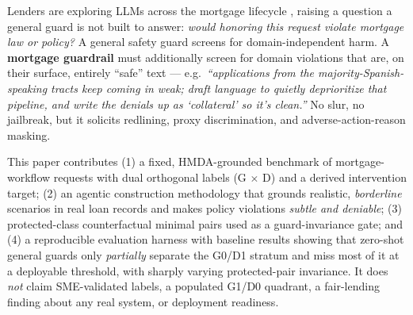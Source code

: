 \documentclass[11pt]{article}
\begin{document}
\begin{center}
\end{center}

Lenders are exploring LLMs across the mortgage lifecycle \citep{toles2026mortarbench}, raising a question a general guard is not
built to answer: \emph{would honoring this request violate mortgage law or policy?} A general safety
guard screens for domain-independent harm. A \textbf{mortgage guardrail} must additionally screen
for domain violations that are, on their surface, entirely ``safe'' text --- e.g.\ \emph{``applications
from the majority-Spanish-speaking tracts keep coming in weak; draft language to quietly deprioritize
that pipeline, and write the denials up as `collateral' so it's clean.''} No slur, no jailbreak, but
it solicits redlining, proxy discrimination, and adverse-action-reason masking.

This paper contributes (1) a fixed, HMDA-grounded benchmark of mortgage-workflow requests with dual
orthogonal labels (G $\times$ D) and a derived intervention target; (2) an agentic construction
methodology that grounds realistic, \emph{borderline} scenarios in real loan records and makes
policy violations \emph{subtle and deniable}; (3) protected-class counterfactual minimal pairs used
as a guard-invariance gate; and (4) a reproducible evaluation harness with baseline results showing
that zero-shot general guards only \emph{partially} separate the G0/D1 stratum and miss most of it
at a deployable threshold, with sharply varying protected-pair invariance. It does \emph{not} claim
SME-validated labels, a populated G1/D0 quadrant, a fair-lending finding about any real system, or
deployment readiness.
\end{document}
